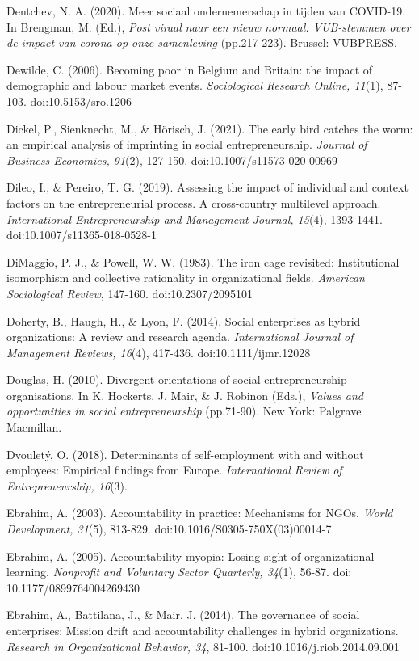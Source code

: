 \documentclass{article}
\begin{document}
Dentchev, N. A. (2020). Meer sociaal ondernemerschap in tijden van COVID-19. In Brengman, M. (Ed.), \emph{Post viraal}\emph{ naar een nieuw normaal: VUB-stemmen over de impact van corona op onze samenleving} (pp.217-223). Brussel: VUBPRESS.

Dewilde, C. (2006). Becoming poor in Belgium and Britain: the impact of demographic and labour market events. \emph{Sociological Research Online, 11}(1), 87-103. doi:10.5153/sro.1206

Dickel, P., Sienknecht, M., \& Hörisch, J. (2021). The early bird catches the worm: an empirical analysis of imprinting in social entrepreneurship. \emph{Journal of Business Economics, 91}(2), 127-150. doi:10.1007/s11573-020-00969

Dileo, I., \& Pereiro, T. G. (2019). Assessing the impact of individual and context factors on the entrepreneurial process. A cross-country multilevel approach. \emph{International Entrepreneurship and Management Journal, 15}(4), 1393-1441. doi:10.1007/s11365-018-0528-1

DiMaggio, P. J., \& Powell, W. W. (1983). The iron cage revisited: Institutional isomorphism and collective rationality in organizational fields. \emph{American Sociological Review}, 147-160. doi:10.2307/2095101

Doherty, B., Haugh, H., \& Lyon, F. (2014). Social enterprises as hybrid organizations: A review and research agenda. \emph{International Journal of Management Reviews, 16}(4), 417-436. doi:10.1111/ijmr.12028

Douglas, H. (2010). Divergent orientations of social entrepreneurship organisations. In K. Hockerts, J. Mair, \& J. Robinon (Eds.), \emph{Values and opportunities in social entrepreneurship} (pp.71-90). New York: Palgrave Macmillan.

Dvouletý, O. (2018). Determinants of self-employment with and without employees: Empirical findings from Europe. \emph{International Review of Entrepreneurship, 16}(3). 

Ebrahim, A. (2003). Accountability in practice: Mechanisms for NGOs. \emph{World Development, 31}(5), 813-829. doi:10.1016/S0305-750X(03)00014-7

Ebrahim, A. (2005). Accountability myopia: Losing sight of organizational learning. \emph{Nonprofit}\emph{ and Voluntary Sector Quarterly, 34}(1), 56-87. doi: 10.1177/0899764004269430

Ebrahim, A., Battilana, J., \& Mair, J. (2014). The governance of social enterprises: Mission drift and accountability challenges in hybrid organizations. \emph{Research in Organizational }\emph{Behavior}\emph{, 34}, 81-100. doi:10.1016/j.riob.2014.09.001
\end{document}
